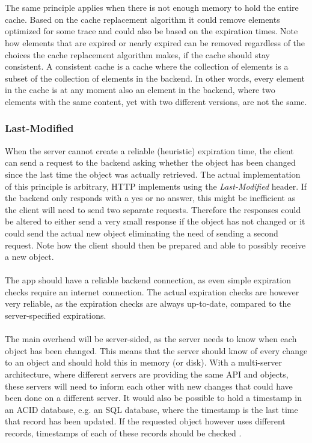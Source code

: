 \documentclass[pdftex,a4paper,12pt,twoside]{report}
\begin{document}
\\\\
The same principle applies when there is not enough memory to hold the entire cache. Based on the cache replacement algorithm it could remove elements optimized for some trace and could also be based on the expiration times. Note how elements that are expired or nearly expired can be removed regardless of the choices the cache replacement algorithm makes, if the cache should stay consistent. A consistent cache is a cache where the collection of elements is a subset of the collection of elements in the backend. In other words, every element in the cache is at any moment also an element in the backend, where two elements with the same content, yet with two different versions, are not the same.
\subsubsection{Last-Modified}
When the server cannot create a reliable (heuristic) expiration time, the client can send a request to the backend asking whether the object has been changed since the last time the object was actually retrieved. The actual implementation of this principle is arbitrary, HTTP implements using the \emph{Last-Modified} header. If the backend only responds with a yes or no answer, this might be inefficient as the client will need to send two separate requests. Therefore the responses could be altered to either send a very small response if the object has not changed or it could send the actual new object eliminating the need of sending a second request. Note how the client should then be prepared and able to possibly receive a new object.
\\\\
The app should have a reliable backend connection, as even simple expiration checks require an internet connection. The actual expiration checks are however very reliable, as the expiration checks are always up-to-date, compared to the server-specified expirations.
\\\\
The main overhead will be server-sided, as the server needs to know when each object has been changed. This means that the server should  know of every change to an object and should hold this in memory (or disk). With a multi-server architecture, where different servers are providing the same API and objects, these servers will need to inform each other with new changes that could have been done on a different server. It would also be possible to hold a timestamp in an ACID database, e.g. an SQL database, where the timestamp is the last time that record has been updated. If the requested object however uses different records, timestamps of each of these records should be checked \citep{http_caching}.
\end{document}
